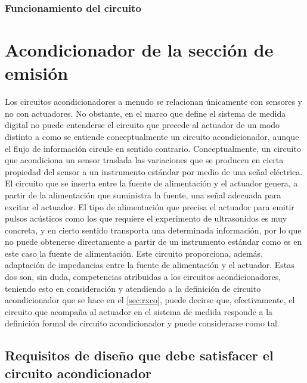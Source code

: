 \subsubsection{Funcionamiento del circuito}


\section{Acondicionador de la sección de emisión}

Los circuitos acondicionadores a menudo se relacionan únicamente con
sensores y no con actuadores. No obstante, en el marco que define el
sistema de medida digital no puede entenderse el circuito que precede al
actuador de un modo distinto a como se entiende conceptualmente un circuito
acondicionador, aunque el flujo de información circule en sentido
contrario. Conceptualmente, un circuito que acondiciona un sensor traslada
las variaciones que se producen en cierta propiedad del sensor a un
instrumento estándar por medio de una señal eléctrica. El circuito que se
inserta entre la fuente de alimentación y el actuador genera, a partir de
la alimentación que suministra la fuente, una señal adecuada para excitar
el actuador. El tipo de alimentación que precisa el actuador para emitir
pulsos acústicos como los que requiere el experimento de ultrasonidos es
muy concreta, y en cierto sentido transporta una determinada información,
por lo que no puede obtenerse directamente a partir de un instrumento
estándar como es en este caso la fuente de alimentación. Este circuito
proporciona, además, adaptación de impedancias entre la fuente de
alimentación y el actuador. Estas dos son, sin duda, competencias
atribuidas a los circuitos acondicionadores, teniendo esto en consideración
y atendiendo a la definición de circuito acondicionador que se hace en el
\cref{sec:rxco}, puede decirse que, efectivamente, el circuito que acompaña
al actuador en el sistema de medida responde a la definición formal de
circuito acondicionador y puede considerarse como tal.


\subsection[Requisitos de diseño del acondicionador]{Requisitos de diseño
que debe satisfacer el circuito acondicionador}


